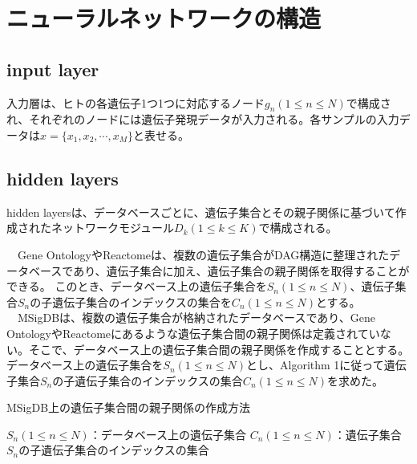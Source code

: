 \documentclass[a4paper,12pt]{jsreport}
\begin{document}
\section{ニューラルネットワークの構造}
\begin{comment}
\#\#\#\#\#\#\#\#\#\#\# \\
input layer、hidden layer、output layerについて全体と図\\
input layerについて\\
hidden layerについて(GO・ractomeとMSigDBのモジュール設計手法)\\
ノードの数の決め方、エッジの計算方法、tanhとbatchnorm\\
output layerについて\\
\#\#\#\#\#\#\#\#\#\#\# \\
\end{comment}


\subsection{input layer}
入力層は、ヒトの各遺伝子1つ1つに対応するノード$g_n(1\leq n\leq N)$で構成され、それぞれのノードには遺伝子発現データが入力される。各サンプルの入力データは$x = \{x_1, x_2, \cdots, x_M\}$と表せる。


\subsection{hidden layers}
hidden layersは、データベースごとに、遺伝子集合とその親子関係に基づいて作成されたネットワークモジュール$D_k(1\leq k\leq K)$で構成される。

　Gene OntologyやReactomeは、複数の遺伝子集合がDAG構造に整理されたデータベースであり、遺伝子集合に加え、遺伝子集合の親子関係を取得することができる。
このとき、データベース上の遺伝子集合を$S_n(1\leq n\leq N)$、遺伝子集合$S_n$の子遺伝子集合のインデックスの集合を$C_n(1\leq n\leq N)$とする。\\
 　MSigDBは、複数の遺伝子集合が格納されたデータベースであり、Gene OntologyやReactomeにあるような遺伝子集合間の親子関係は定義されていない。そこで、データベース上の遺伝子集合間の親子関係を作成することとする。データベース上の遺伝子集合を$S_n(1\leq n\leq N)$とし、Algorithm 1に従って遺伝子集合$S_n$の子遺伝子集合のインデックスの集合$C_n(1\leq n\leq N)$を求めた。\\
 \begin{algorithm}[H]
 \caption{MSigDB上の遺伝子集合間の親子関係の作成方法}
 \begin{algorithmic}[1]
 \renewcommand{\algorithmicrequire}{\textbf{Input:}}
 \renewcommand{\algorithmicensure}{\textbf{Output:}}
 \REQUIRE $S_n(1\leq n\leq N)$：データベース上の遺伝子集合
 \ENSURE  $C_n(1\leq n\leq N)$：遺伝子集合$S_n$の子遺伝子集合のインデックスの集合
 \ENDIF
 \ENDFOR
 \ENDFOR
 \end{algorithmic} 
 \end{algorithm}
\end{document}
